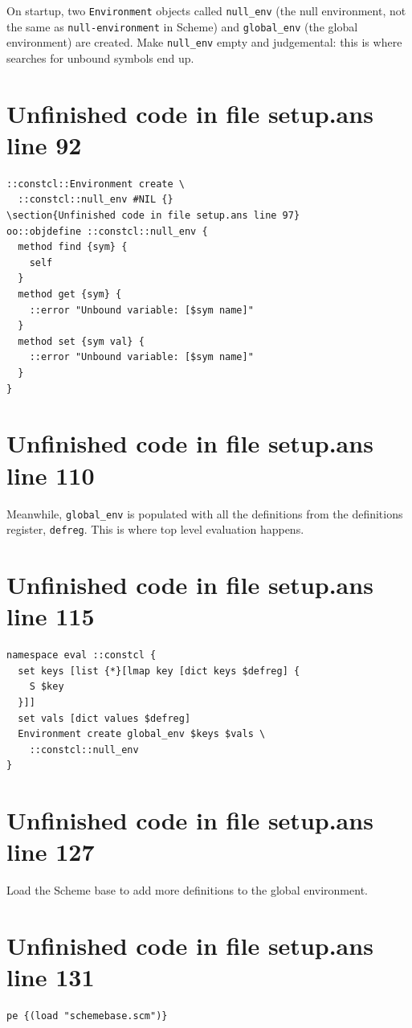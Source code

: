 \documentclass[twoside,9pt]{report}
\begin{document}
On startup, two \texttt{Environment} objects called \texttt{null\_env} (the null environment, not the same as \texttt{null-environment} in Scheme) and \texttt{global\_env} (the global environment) are created. Make \texttt{null\_env} empty and judgemental: this is where searches for unbound symbols end up.

\section{Unfinished code in file setup.ans line 92}
\begin{lstlisting}
::constcl::Environment create \
  ::constcl::null_env #NIL {}
\section{Unfinished code in file setup.ans line 97}
oo::objdefine ::constcl::null_env {
  method find {sym} {
    self
  }
  method get {sym} {
    ::error "Unbound variable: [$sym name]"
  }
  method set {sym val} {
    ::error "Unbound variable: [$sym name]"
  }
}
\end{lstlisting}
\section{Unfinished code in file setup.ans line 110}


Meanwhile, \texttt{global\_env} is populated with all the definitions from the definitions register, \texttt{defreg}. This is where top level evaluation happens.

\section{Unfinished code in file setup.ans line 115}
\begin{lstlisting}
namespace eval ::constcl {
  set keys [list {*}[lmap key [dict keys $defreg] {
    S $key
  }]]
  set vals [dict values $defreg]
  Environment create global_env $keys $vals \
    ::constcl::null_env
}
\end{lstlisting}
\section{Unfinished code in file setup.ans line 127}


Load the Scheme base to add more definitions to the global environment.

\section{Unfinished code in file setup.ans line 131}
\begin{lstlisting}
pe {(load "schemebase.scm")}
\end{lstlisting}
\end{document}
